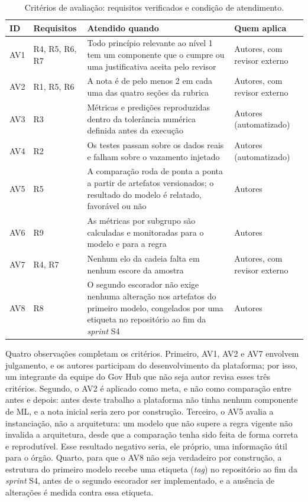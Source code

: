 \begin{table}[htbp]
	\centering
	\caption{Critérios de avaliação: requisitos verificados e condição de atendimento.}
	\label{tab:avaliacao-verificacao}
	\small
	\begin{tabularx}{\textwidth}{@{}l>{\raggedright\arraybackslash}p{2.0cm}>{\raggedright\arraybackslash}X>{\raggedright\arraybackslash}p{2.9cm}@{}}
		\toprule
		\textbf{ID} & \textbf{Requisitos} & \textbf{Atendido quando} & \textbf{Quem aplica} \\
		\midrule
		AV1 & R4, R5, R6, R7 & Todo princípio relevante ao nível 1 tem um componente que o cumpre ou uma justificativa aceita pelo revisor & Autores, com revisor externo \\ \addlinespace
		AV2 & R1, R5, R6 & A nota é de pelo menos 2 em cada uma das quatro seções da rubrica & Autores, com revisor externo \\ \addlinespace
		AV3 & R3 & Métricas e predições reproduzidas dentro da tolerância numérica definida antes da execução & Autores (automatizado) \\ \addlinespace
		AV4 & R2 & Os testes passam sobre os dados reais e falham sobre o vazamento injetado & Autores (automatizado) \\ \addlinespace
		AV5 & R5 & A comparação roda de ponta a ponta a partir de artefatos versionados; o resultado do modelo é relatado, favorável ou não & Autores \\ \addlinespace
		AV6 & R9 & As métricas por subgrupo são calculadas e monitoradas para o modelo e para a regra & Autores \\ \addlinespace
		AV7 & R4, R7 & Nenhum elo da cadeia falta em nenhum escore da amostra & Autores, com revisor externo \\ \addlinespace
		AV8 & R8 & O segundo escorador não exige nenhuma alteração nos artefatos do primeiro modelo, congelados por uma etiqueta no repositório ao fim da \textit{sprint} S4 & Autores \\
		\bottomrule
	\end{tabularx}
\end{table}

Quatro observações completam os critérios. Primeiro, AV1, AV2 e AV7 envolvem julgamento, e os autores participam do desenvolvimento da plataforma; por isso, um integrante da equipe do Gov Hub que não seja autor revisa esses três critérios. Segundo, o AV2 é aplicado como meta, e não como comparação entre antes e depois: antes deste trabalho a plataforma não tinha nenhum componente de ML, e a nota inicial seria zero por construção. Terceiro, o AV5 avalia a instanciação, não a arquitetura: um modelo que não supere a regra vigente não invalida a arquitetura, desde que a comparação tenha sido feita de forma correta e reprodutível. Esse resultado negativo seria, ele próprio, uma informação útil para o órgão. Quarto, para que o AV8 não seja verdadeiro por construção, a estrutura do primeiro modelo recebe uma etiqueta (\textit{tag}) no repositório ao fim da \textit{sprint} S4, antes de o segundo escorador ser implementado, e a ausência de alterações é medida contra essa etiqueta.


